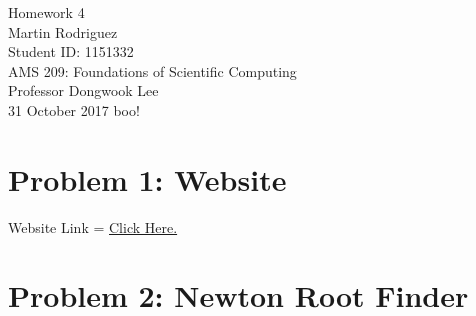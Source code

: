 \documentclass[12pt]{article}
\begin{document}
\begin{center}
	{\LARGE Homework 4} \\[10pt] 
	{ Martin Rodriguez} \\
	Student ID: 1151332\\
	AMS 209: Foundations of Scientific Computing\\
	Professor Dongwook Lee\\[10 pt]	
	31 October 2017 {\tiny boo!} \\[30 pt]
\end{center}


\section*{{\large Problem 1: Website}}

Website Link = \href{https://people.ucsc.edu/~mrodrig6/}{Click Here.}


\section*{{\large Problem 2: Newton Root Finder}}
\end{document}
